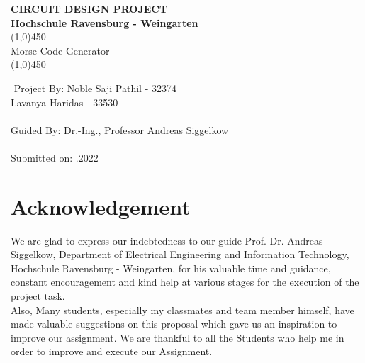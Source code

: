 \documentclass[12pt,a4paper]{article}
\begin{document}
\begin{titlepage}
\begin{center}
\setcounter{page}{1}

\thispagestyle{a}
\vspace*{2cm}
\huge{\textbf{CIRCUIT DESIGN PROJECT}} \\[4mm]
\Large{\textbf{Hochschule Ravensburg - Weingarten}}\\ [1.5cm]

\line(1,0){450}\\
Morse Code Generator \\
\line(1,0){450}\\ [0.75cm]


 

\begin{tabbing}
\hspace{6cm}\=\hspace{4.5cm}\=\kill
 Project By: \> Noble Saji Pathil - 32374   \>  \\
  \> Lavanya Haridas - 33530 \>   \\ \\
 Guided By: \>Dr.-Ing., Professor Andreas Siggelkow  \>    \\ \\
 
   Submitted on:   .2022 \> 
\end{tabbing} 


\end{center}
\end{titlepage}

\newpage
\pagestyle{fancy}
\fancyfoot{}
\fancyhead{}

\setlength{\footskip=0pt}
\setlength{\headheight=35pt}

\newpage


\section*{Acknowledgement}

We are glad to express our indebtedness to our guide Prof. Dr. Andreas Siggelkow, Department of Electrical Engineering and Information Technology, Hochschule Ravensburg - Weingarten, for his valuable time and guidance, constant encouragement and kind help at various stages for the execution of the project task.\\

Also, Many students, especially my classmates and team member himself, have made valuable suggestions on this proposal which gave us an inspiration to improve our assignment. We are thankful to all the Students who help me in order to improve and execute our Assignment.\\
\end{document}
